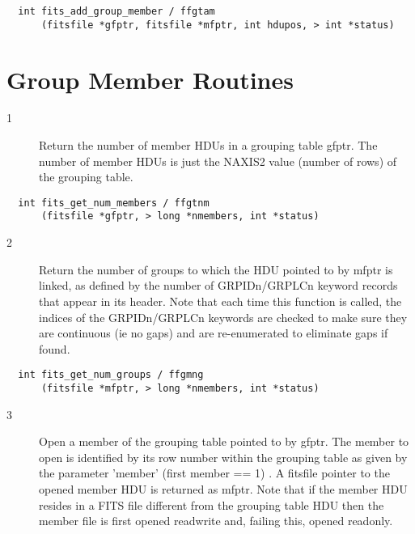 \documentclass[11pt]{book}
\begin{document}
\begin{verbatim}
  int fits_add_group_member / ffgtam
      (fitsfile *gfptr, fitsfile *mfptr, int hdupos, > int *status)
\end{verbatim}


\section{Group Member Routines}


\begin{description}
\item[1 ] Return the number of member HDUs in a grouping table gfptr. The number
    of member HDUs is just the NAXIS2 value (number of rows) of the grouping
   table. \label{ffgtnm}
\end{description}

\begin{verbatim}
  int fits_get_num_members / ffgtnm
      (fitsfile *gfptr, > long *nmembers, int *status)
\end{verbatim}

\begin{description}
\item[2 ]  Return the number of groups to which the HDU pointed to by mfptr is
     linked, as defined by the number of GRPIDn/GRPLCn keyword records that
     appear in its header. Note that each time this function is called, the
     indices of the GRPIDn/GRPLCn keywords are checked to make sure they
     are continuous (ie no gaps) and are re-enumerated to eliminate gaps if
    found.  \label{ffgmng}
\end{description}

\begin{verbatim}
  int fits_get_num_groups / ffgmng
      (fitsfile *mfptr, > long *nmembers, int *status)
\end{verbatim}

\begin{description}
\item[3 ] Open a member of the grouping table pointed to by gfptr. The member to
    open is identified by its row number within the grouping table as given
    by the parameter 'member' (first member == 1) . A fitsfile pointer to
    the opened member HDU is returned as mfptr. Note that if the member HDU
    resides in a FITS file different from the grouping table HDU then the
   member file is first opened readwrite and, failing this, opened readonly. \label{ffgmop}
\end{description}
\end{document}
